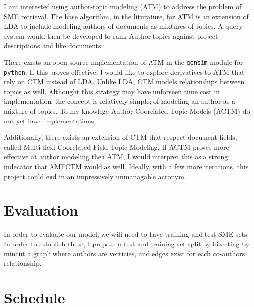 \documentclass{article}
\begin{document}
\begin{multicols}{2}
I am interested using author-topic\cite{Rosen-Zvi2004} modeling (ATM) to address the
problem of SME retrieval. The base algorithm, in the liturature, for ATM is an
extension of LDA to include modeling authors of documents as mixtures of topics. A
query system would then be developed to rank Author-topics against project
descriptions and like documents.

There exists an open-source implementation of ATM in the \texttt{gensim}\cite{rehurek_lrec}
module for \texttt{python}. If this proves effective, I would like to explore
derivatives to ATM that rely on CTM instead of LDA. Unlike LDA, CTM models
relationships between topics as well. Althought this strategy may have unforseen time
cost in implementation, the concept is relatively simple; of modeling an author as a
mixture of topics. To my knowlege Author-Coorelated-Topic Models (ACTM) do not yet
have implementations.

Additionally, there exists an extension of CTM that respect document fields, called
Multi-field Coorelated Field Topic Modeling\cite{Salomatin2009MultifieldCT}. If ACTM
proves more effective at author modeling then ATM, I would interpret this as a strong
indecator that AMFCTM would as well. Ideally, with a few more iterations, this
project could end in an impressively unmanagable acronym.

\section{Evaluation}

In order to evaluate our model, we will need to have training and test SME sets. In
order to establish these, I propose a test and training set split by bisecting by
mincut\cite{Feige2002} a graph where authors are verticies, and edges exist for each
co-authors relationship.



\section{Schedule}


\begin{comment}

The \texttt{A-Team} currently has a proposed solution, XXX. I am tasked with providing a competing solution, that can learn from more general corpus. This will allow us to compare results in a useful way.


\end{comment}
\end{multicols}
\end{document}
